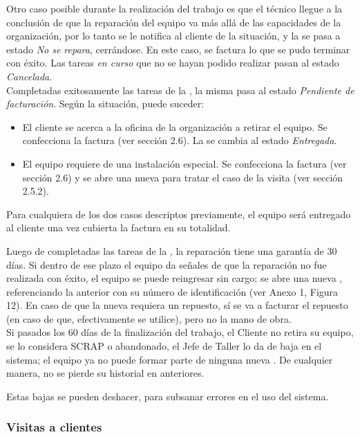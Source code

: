 \documentclass[12pt]{extarticle}
\begin{document}
\begin{spacing}{1.2}
    Otro caso posible durante la realización del trabajo es que el técnico llegue a la conclusión de que la reparación del equipo va más allá de las capacidades de la organización, por lo tanto se le notifica al cliente de la situación, y la \OT{} se pasa a estado \textit{No se repara}, cerrándose. En este caso, se factura lo que se pudo terminar con éxito. Las tareas \textit{en curso} que no se hayan podido realizar pasan al estado \textit{Cancelada}.\\

    Completadas exitosamente las tareas de la \OT{}, la misma pasa al estado \textit{Pendiente de facturación}. Según la situación, puede suceder:
    \begin{itemize}
        \item El cliente se acerca a la oficina de la organización a retirar el equipo. Se confecciona la factura (ver sección 2.6). La \OT{} se cambia al estado \textit{Entregada}.
        \item El equipo requiere de una instalación especial. Se confecciona la factura (ver sección 2.6) y se abre una nueva \OT{} para tratar el caso de la visita (ver sección 2.5.2).
    \end{itemize}

    Para cualquiera de los dos casos descriptos previamente, el equipo será entregado al cliente una vez cubierta la factura en su totalidad.

    Luego de completadas las tareas de la \OT{}, la reparación tiene una garantía de 30 días. Si dentro de ese plazo el equipo da señales de que la reparación no fue realizada con éxito, el equipo se puede reingresar sin cargo; se abre una nueva \OT{}, referenciando la \OT{} anterior con su número de identificación (ver Anexo 1, Figura 12). En caso de que la nueva \OT{} requiera un repuesto, sí se va a facturar el repuesto (en caso de que, efectivamente se utilice), pero no la mano de obra. \\
    
    Si pasados los 60 días de la finalización del trabajo, el Cliente no retira su equipo, se lo considera SCRAP o abandonado, el Jefe de Taller lo da de baja en el sistema; el equipo ya no puede formar parte de ninguna nueva \OT{}. De cualquier manera, no se pierde su historial en \OTs{} anteriores.

    Estas bajas se pueden deshacer, para subsanar errores en el uso del sistema.

    \subsubsection{Visitas a clientes}


\end{spacing}
\end{document}
